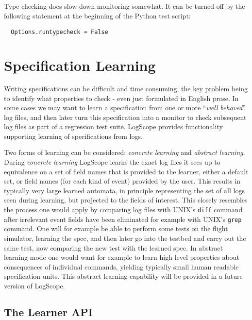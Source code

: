 \documentclass{report}
\newcommand{\python}{{\sc Python}}
\newcommand{\logscope}{{\sc LogScope}}
\begin{document}
\vspace{0.3cm}

\noindent
Type checking does slow down monitoring somewhat. It can be turned off by the following
statement at the beginning of the \python{} test script:

\begin{verbatim}
  Options.runtypecheck = False
\end{verbatim}

\chapter{Specification Learning}

Writing specifications can be difficult and time consuming, the key problem being
to identify what properties to check - even just formulated in English prose.
In some cases we may want to learn a specification from  one or more ``{\em well behaved}'' log files, and then later turn this specification into a monitor to check
subsequent log files as part of a regression test suite. \logscope{} provides functionality supporting learning of specifications from logs.

Two forms of learning can be considered: {\em concrete learning} and {\em abstract learning}.
During {\em concrete learning} \logscope{} learns the exact log files it sees up to equivalence on a set of field names that is provided to the learner, either a default set, or field names (for each kind of event) provided
by the user. This results in typically very large learned automata, in principle representing the set of all logs seen during learning, but  projected to the fields of interest. This closely resembles the process one would apply by comparing log files with UNIX's {\tt diff} command after irrelevant event fields have been eliminated for example with UNIX's {\tt grep} command. One will for example be able
to perform some tests on the flight simulator, learning the spec, and then later go into the testbed and carry out the same test, now comparing the new test with the learned spec.
In abstract learning mode one would want for example to learn high level properties about consequences of individual commands, yielding typically small human readable specification units. This abstract learning capability will be provided in a future version of
\logscope{}.

\section{The Learner API}
\end{document}
